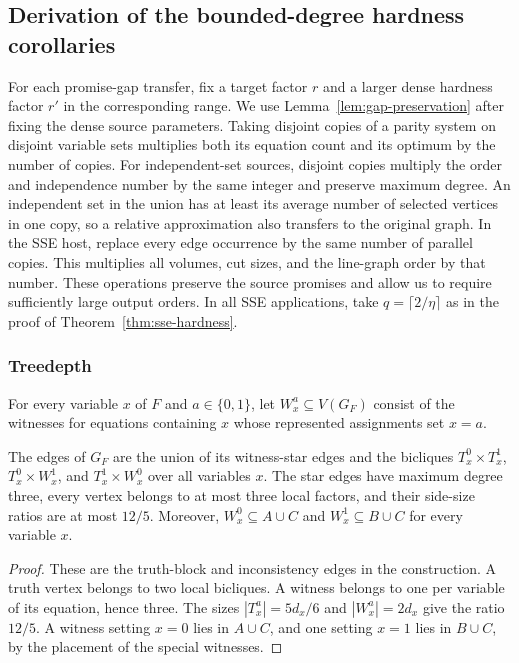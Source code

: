 \subsection{Derivation of the bounded-degree hardness corollaries}
\label{app:bounded-degree-hardness}

For each promise-gap transfer, fix a target factor $r$ and a larger
dense hardness factor $r'$ in the corresponding range. We use
Lemma~\ref{lem:gap-preservation} after fixing the dense source
parameters. Taking disjoint copies of a parity system on disjoint
variable sets multiplies both its equation count and its optimum
by the number of copies. For independent-set sources, disjoint
copies multiply the order and independence number by the same
integer and preserve maximum degree. An independent set in the
union has at least its average number of selected vertices in one
copy, so a relative approximation also transfers to the original
graph. In the SSE host, replace every
edge occurrence by the same number of parallel copies. This
multiplies all volumes, cut sizes, and the line-graph order by that
number. These operations preserve the source promises and allow
us to require sufficiently large output orders.
In all SSE applications, take $q=\lceil2/\eta\rceil$ as in the
proof of Theorem~\ref{thm:sse-hardness}.

\subsubsection{Treedepth}
\label{app:bounded-degree-treedepth}

For every variable $x$ of $F$ and $a\in\{0,1\}$, let
$W_x^a\subseteq V(G_F)$ consist of the witnesses for equations
containing $x$ whose represented assignments set $x=a$.

\begin{lemma}\label{lem:parity-local-factors}
The edges of $G_F$ are the union of its witness-star edges and the
bicliques $T_x^0\times T_x^1$, $T_x^0\times W_x^1$, and
$T_x^1\times W_x^0$ over all variables $x$.
The star edges have maximum degree three, every vertex belongs to
at most three local factors, and their side-size ratios are at
most $12/5$. Moreover, $W_x^0\subseteq A\cup C$ and
$W_x^1\subseteq B\cup C$ for every variable $x$.
\end{lemma}

\begin{proof}
These are the truth-block and inconsistency edges in the
construction. A truth vertex belongs to two local bicliques. A
witness belongs to one per variable of its equation, hence three.
The sizes $|T_x^a|=5d_x/6$ and $|W_x^a|=2d_x$ give the ratio
$12/5$. A witness setting $x=0$ lies in $A\cup C$, and one
setting $x=1$ lies in $B\cup C$, by the placement of the special
witnesses.
\end{proof}

